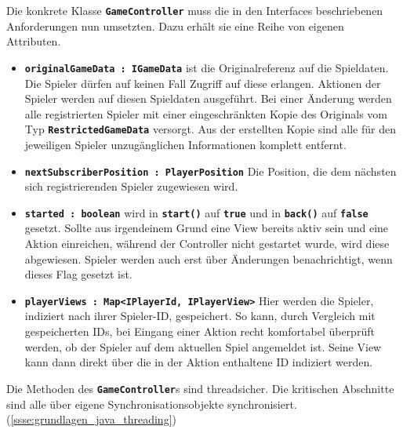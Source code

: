 \documentclass[
							a4paper, 
							11pt, 
							openany, 
							liststotoc,
							parskip=half, 
   							headings=normal
						]{scrreprt}
\begin{document}
{Die konkrete Klasse \textbf{\texttt{GameController}} muss die in den Interfaces beschriebenen Anforderungen nun umsetzten. Dazu erhält sie eine Reihe von eigenen Attributen.
\begin{itemize}
	\item \textbf{\texttt{originalGameData : IGameData}} ist die Originalreferenz auf die Spieldaten. Die Spieler dürfen auf keinen Fall Zugriff auf diese erlangen. Aktionen der Spieler werden auf diesen Spieldaten ausgeführt. Bei einer Änderung werden alle registrierten Spieler mit einer eingeschränkten Kopie des Originals vom Typ \textbf{\texttt{RestrictedGameData}} versorgt. Aus der erstellten Kopie sind alle für den jeweiligen Spieler unzugänglichen Informationen komplett entfernt.
	\item \textbf{\texttt{nextSubscriberPosition : PlayerPosition}} Die Position, die dem nächsten sich registrierenden Spieler zugewiesen wird. 
	\item \textbf{\texttt{started : boolean}} wird in \textbf{\texttt{start()}} auf \textbf{\texttt{true}} und in \textbf{\texttt{back()}} auf \textbf{\texttt{false}} gesetzt. Sollte aus irgendeinem Grund eine View bereits aktiv sein und eine Aktion einreichen, während der Controller nicht gestartet wurde, wird diese abgewiesen. Spieler werden auch erst über Änderungen benachrichtigt, wenn dieses Flag gesetzt ist.
	\item \textbf{\texttt{playerViews : Map{\textless}IPlayerId, IPlayerView{\textgreater}}} Hier werden die Spieler, indiziert nach ihrer Spieler-ID, gespeichert. So kann, durch Vergleich mit gespeicherten IDs, bei Eingang einer Aktion recht komfortabel überprüft werden, ob der Spieler auf dem aktuellen Spiel angemeldet ist. Seine View kann dann direkt über die in der Aktion enthaltene ID indiziert werden.
\end{itemize}\bigskip

Die Methoden des \textbf{\texttt{GameController}}s sind threadsicher. Die kritischen Abschnitte sind alle über eigene Synchronisationsobjekte synchronisiert. (\autoref{ssse:grundlagen_java_threading})

}
\end{document}
